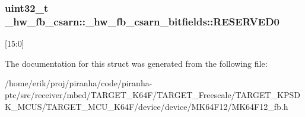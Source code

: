 \subsubsection[{\texorpdfstring{R\+E\+S\+E\+R\+V\+E\+D0}{RESERVED0}}]{\setlength{\rightskip}{0pt plus 5cm}uint32\+\_\+t \+\_\+hw\+\_\+fb\+\_\+csarn\+::\+\_\+hw\+\_\+fb\+\_\+csarn\+\_\+bitfields\+::\+R\+E\+S\+E\+R\+V\+E\+D0}\hypertarget{struct__hw__fb__csarn_1_1__hw__fb__csarn__bitfields_ab1ad77de27044aa4dfe5fcd52a943270}{}\label{struct__hw__fb__csarn_1_1__hw__fb__csarn__bitfields_ab1ad77de27044aa4dfe5fcd52a943270}
\mbox{[}15\+:0\mbox{]} 

The documentation for this struct was generated from the following file\+:\begin{DoxyCompactItemize}
\item 
/home/erik/proj/piranha/code/piranha-\/ptc/src/receiver/mbed/\+T\+A\+R\+G\+E\+T\+\_\+\+K64\+F/\+T\+A\+R\+G\+E\+T\+\_\+\+Freescale/\+T\+A\+R\+G\+E\+T\+\_\+\+K\+P\+S\+D\+K\+\_\+\+M\+C\+U\+S/\+T\+A\+R\+G\+E\+T\+\_\+\+M\+C\+U\+\_\+\+K64\+F/device/device/\+M\+K64\+F12/M\+K64\+F12\+\_\+fb.\+h\end{DoxyCompactItemize}

